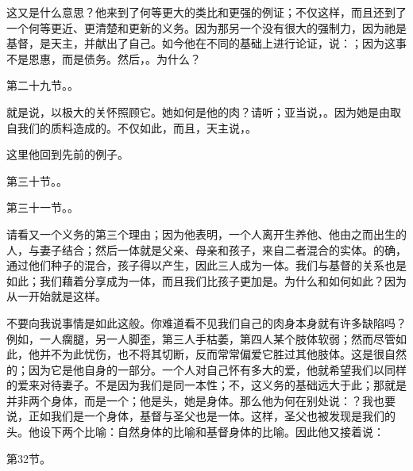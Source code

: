 这又是什么意思？他来到了何等更大的类比和更强的例证；不仅这样，而且还到了一个何等更近、更清楚和更新的义务。因为那另一个没有很大的强制力，因为祂是基督，是天主，并献出了自己。如今他在不同的基础上进行论证，说：；因为这事不是恩惠，而是债务。然后，。为什么？\par

第二十九节。。\par

就是说，以极大的关怀照顾它。她如何是他的肉？请听；亚当说，。因为她是由取自我们的质料造成的。不仅如此，而且，天主说，。\par

这里他回到先前的例子。\par

第三十节。。\par

第三十一节。。\par

请看又一个义务的第三个理由；因为他表明，一个人离开生养他、他由之而出生的人，与妻子结合；然后一体就是父亲、母亲和孩子，来自二者混合的实体。的确，通过他们种子的混合，孩子得以产生，因此三人成为一体。我们与基督的关系也是如此；我们藉着分享成为一体，而且我们比孩子更加是。为什么和如何如此？因为从一开始就是这样。\par

不要向我说事情是如此这般。你难道看不见我们自己的肉身本身就有许多缺陷吗？例如，一人瘸腿，另一人脚歪，第三人手枯萎，第四人某个肢体软弱；然而尽管如此，他并不为此忧伤，也不将其切断，反而常常偏爱它胜过其他肢体。这是很自然的；因为它是他自身的一部分。一个人对自己怀有多大的爱，他就希望我们以同样的爱来对待妻子。不是因为我们是同一本性；不，这义务的基础远大于此；那就是并非两个身体，而是一个；他是头，她是身体。那么他为何在别处说：？我也要说，正如我们是一个身体，基督与圣父也是一体。这样，圣父也被发现是我们的头。他设下两个比喻：自然身体的比喻和基督身体的比喻。因此他又接着说：\newline{}\par

第32节。\newline{}\par


